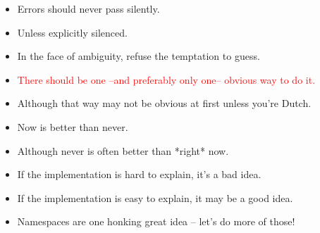 \documentclass{beamer}
\begin{document}
\begin{frame}
\begin{itemize}
 \item Errors should never pass silently.
 \item Unless explicitly silenced.
 \item In the face of ambiguity, refuse the temptation to guess.
 \item \textcolor{red}{There should be one --and preferably only one-- obvious way to do it.}
 \item Although that way may not be obvious at first unless you're Dutch.
 \item Now is better than never.
 \item Although never is often better than *right* now.
 \item If the implementation is hard to explain, it's a bad idea.
 \item If the implementation is easy to explain, it may be a good idea.
 \item Namespaces are one honking great idea -- let's do more of those!

\end{itemize}



\end{frame}
\end{document}
